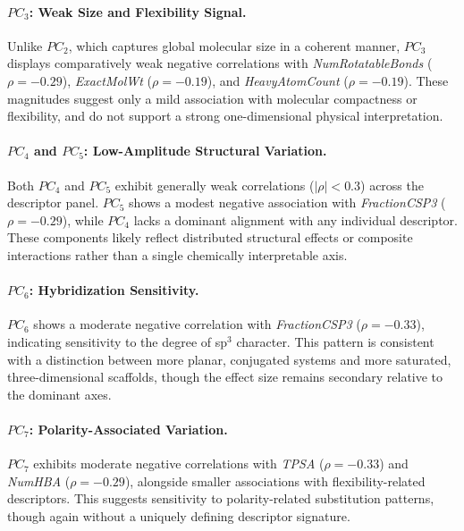 \paragraph{$PC_3$: Weak Size and Flexibility Signal.}
Unlike $PC_2$, which captures global molecular size in a coherent manner, $PC_3$ displays comparatively weak negative correlations with \textit{NumRotatableBonds} ($\rho = -0.29$), \textit{ExactMolWt} ($\rho = -0.19$), and \textit{HeavyAtomCount} ($\rho = -0.19$). These magnitudes suggest only a mild association with molecular compactness or flexibility, and do not support a strong one-dimensional physical interpretation.

\paragraph{$PC_4$ and $PC_5$: Low-Amplitude Structural Variation.}
Both $PC_4$ and $PC_5$ exhibit generally weak correlations ($|\rho| < 0.3$) across the descriptor panel. $PC_5$ shows a modest negative association with \textit{FractionCSP3} ($\rho = -0.29$), while $PC_4$ lacks a dominant alignment with any individual descriptor. These components likely reflect distributed structural effects or composite interactions rather than a single chemically interpretable axis.

\paragraph{$PC_6$: Hybridization Sensitivity.}
$PC_6$ shows a moderate negative correlation with \textit{FractionCSP3} ($\rho = -0.33$), indicating sensitivity to the degree of sp$^3$ character. This pattern is consistent with a distinction between more planar, conjugated systems and more saturated, three-dimensional scaffolds, though the effect size remains secondary relative to the dominant axes.

\paragraph{$PC_7$: Polarity-Associated Variation.}
$PC_7$ exhibits moderate negative correlations with \textit{TPSA} ($\rho = -0.33$) and \textit{NumHBA} ($\rho = -0.29$), alongside smaller associations with flexibility-related descriptors. This suggests sensitivity to polarity-related substitution patterns, though again without a uniquely defining descriptor signature.

